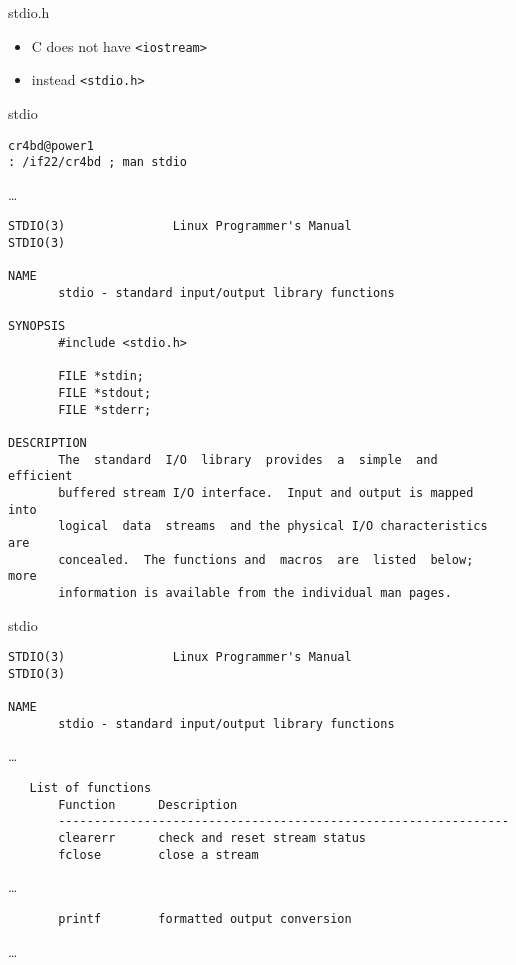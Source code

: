 \begin{frame}[fragile]{stdio.h}
\begin{itemize}
\item C does not have \lstinline|<iostream>|
\item instead \lstinline|<stdio.h>|
\end{itemize}
\end{frame}

\begin{frame}[fragile]{stdio}
\scriptsize
\begin{verbatim}
cr4bd@power1
: /if22/cr4bd ; man stdio
\end{verbatim}
\ldots
\begin{Verbatim}
STDIO(3)               Linux Programmer's Manual               STDIO(3)

NAME
       stdio - standard input/output library functions

SYNOPSIS
       #include <stdio.h>

       FILE *stdin;
       FILE *stdout;
       FILE *stderr;

DESCRIPTION
       The  standard  I/O  library  provides  a  simple  and  efficient
       buffered stream I/O interface.  Input and output is mapped  into
       logical  data  streams  and the physical I/O characteristics are
       concealed.  The functions and  macros  are  listed  below;  more
       information is available from the individual man pages.
\end{Verbatim}
\end{frame}

\begin{frame}[fragile]{stdio}
\scriptsize
\begin{verbatim}
STDIO(3)               Linux Programmer's Manual               STDIO(3)

NAME
       stdio - standard input/output library functions
\end{verbatim}
\ldots
\begin{verbatim}
   List of functions
       Function      Description
       ---------------------------------------------------------------
       clearerr      check and reset stream status
       fclose        close a stream 
\end{verbatim}
\ldots
\begin{verbatim}
       printf        formatted output conversion
\end{verbatim}
\ldots
\end{frame}

